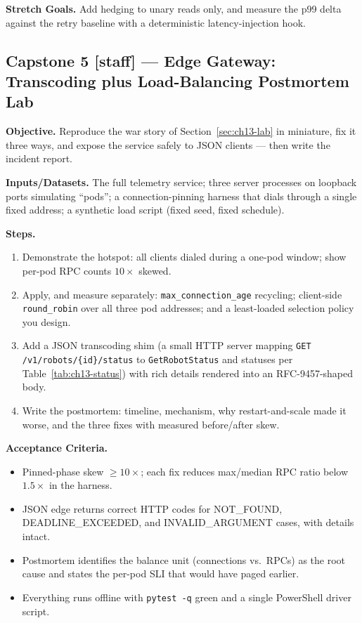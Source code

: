 \textbf{Stretch Goals.} Add hedging to unary reads only, and measure the p99
delta against the retry baseline with a deterministic latency-injection hook.

\subsection{Capstone 5 [staff] --- Edge Gateway: Transcoding plus Load-Balancing
Postmortem Lab}

\textbf{Objective.} Reproduce the war story of Section~\ref{sec:ch13-lab} in
miniature, fix it three ways, and expose the service safely to JSON clients ---
then write the incident report.

\textbf{Inputs/Datasets.} The full telemetry service; three server processes on
loopback ports simulating ``pods''; a connection-pinning harness that dials
through a single fixed address; a synthetic load script (fixed seed, fixed
schedule).

\textbf{Steps.}
\begin{enumerate}
  \item Demonstrate the hotspot: all clients dialed during a one-pod window;
        show per-pod RPC counts $10\times$ skewed.
  \item Apply, and measure separately: \texttt{max\_connection\_age}
        recycling; client-side \texttt{round\_robin} over all three pod
        addresses; and a least-loaded selection policy you design.
  \item Add a JSON transcoding shim (a small HTTP server mapping
        \texttt{GET /v1/robots/\{id\}/status} to \texttt{GetRobotStatus} and
        statuses per Table~\ref{tab:ch13-status}) with rich details rendered
        into an RFC-9457-shaped body.
  \item Write the postmortem: timeline, mechanism, why restart-and-scale
        made it worse, and the three fixes with measured before/after skew.
\end{enumerate}

\textbf{Acceptance Criteria.}
\begin{itemize}
  \item[$\square$] Pinned-phase skew $\geq 10\times$; each fix reduces max/median
        RPC ratio below $1.5\times$ in the harness.
  \item[$\square$] JSON edge returns correct HTTP codes for NOT\_FOUND,
        DEADLINE\_EXCEEDED, and INVALID\_ARGUMENT cases, with details intact.
  \item[$\square$] Postmortem identifies the balance unit (connections vs.\
        RPCs) as the root cause and states the per-pod SLI that would have
        paged earlier.
  \item[$\square$] Everything runs offline with \texttt{pytest -q} green and a
        single PowerShell driver script.
\end{itemize}

